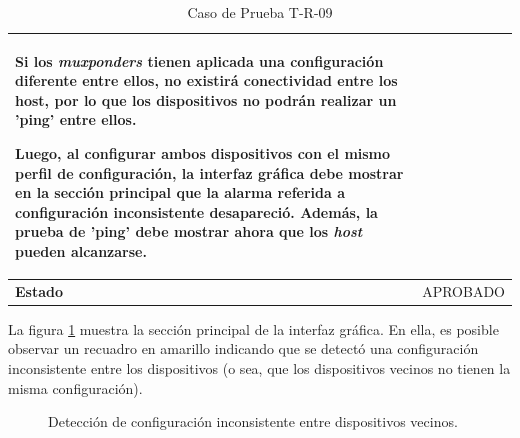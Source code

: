 \begin{table}[H]
\begin{tabular}{ |m{2.5cm}|m{11cm}|  }
        Si los \textit{muxponders} tienen aplicada una configuración diferente entre ellos, no existirá conectividad entre los host, por lo que los dispositivos no podrán realizar un 'ping' entre ellos.
 
        Luego, al configurar ambos dispositivos con el mismo perfil de configuración, la interfaz gráfica debe mostrar en la sección principal que la alarma referida a configuración inconsistente desapareció. Además, la prueba de 'ping' debe mostrar ahora que los \textit{host} pueden alcanzarse.
          \\
        
          \hline
        \centering
          \textbf{Estado}    & APROBADO  \\
        \hline
        \end{tabular}
        
        \caption{Caso de Prueba T-R-09}
        \label{tab:TR09}
        \end{table}

      La figura \ref{fig:test9_1} muestra la sección principal de la interfaz gráfica. En ella, es posible observar un recuadro en amarillo indicando que se detectó una configuración inconsistente entre los dispositivos (o sea, que los dispositivos vecinos no tienen la misma configuración). 

      \begin{figure}[H]
        \centering
        \caption{Detección de configuración inconsistente entre dispositivos vecinos.}
        \label{fig:test9_1}
      \end{figure}

